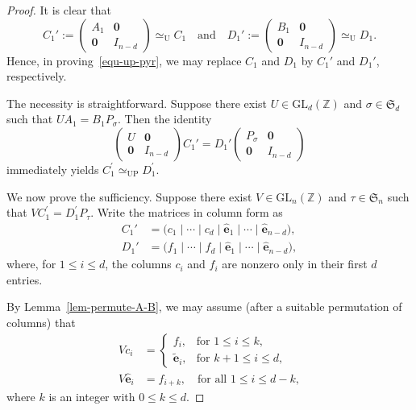 \documentclass[reqno, 12pt]{article}
\theoremstyle{mydefinition}
\theoremstyle{myremark}
\numberwithin{algorithm}{section}
\begin{document}
\begin{proof}
It is clear that
\[
C_1' := \begin{pmatrix}
A_1 & \mathbf{0} \\
\mathbf{0} & I_{n-d}
\end{pmatrix} \simeq_{\mathrm{U}} C_1
\quad \text{and} \quad
D_1' := \begin{pmatrix}
B_1 & \mathbf{0} \\
\mathbf{0} & I_{n-d}
\end{pmatrix} \simeq_{\mathrm{U}} D_1.
\]
Hence, in proving~\eqref{equ-up-pyr}, we may replace $C_1$ and $D_1$ by $C_1'$ and $D_1'$, respectively.

The necessity is straightforward. Suppose there exist $U \in \mathrm{GL}_{d}(\mathbb{Z})$ and $\sigma \in \mathfrak{S}_d$ such that $UA_1 = B_1P_\sigma$. Then the identity
\[
\begin{pmatrix}
U & \mathbf{0} \\
\mathbf{0} & I_{n-d}
\end{pmatrix}
C_1' =
D_1'
\begin{pmatrix}
P_\sigma & \mathbf{0} \\
\mathbf{0} & I_{n-d}
\end{pmatrix}
\]
immediately yields $C_1^{\prime} \simeq_{\mathrm{UP}} D_1^{\prime}$.

We now prove the sufficiency. Suppose there exist $V \in \mathrm{GL}_{n}(\mathbb{Z})$ and $\tau \in \mathfrak{S}_n$ such that $VC_1^{\prime} = D_1^{\prime}P_\tau$. Write the matrices in column form as
\begin{align*}
C_1' &= \big( c_1 \mid \cdots \mid c_{d} \mid \widehat{\mathbf{e}}_1 \mid \cdots \mid \widehat{\mathbf{e}}_{n-d} \big), \\
D_1' &= \big( f_1 \mid \cdots \mid f_{d} \mid \widehat{\mathbf{e}}_1 \mid \cdots \mid \widehat{\mathbf{e}}_{n-d} \big),
\end{align*}
where, for $1 \le i \le d$, the columns $c_i$ and $f_i$ are nonzero only in their first $d$ entries.

By Lemma~\ref{lem-permute-A-B}, we may assume (after a suitable permutation of columns) that
\begin{align}
V c_i &=
\begin{cases}
f_i, & \text{for } 1 \le i \le k, \\
\widetilde{\mathbf{e}}_{i}, & \text{for } k+1 \le i \le d,
\end{cases}
\label{eq:combined1} \\
V \widehat{\mathbf{e}}_i &= f_{i+k}, \quad \text{for all } 1 \le i \le d-k, \label{eq:combined2}
\end{align}
where $k$ is an integer with $0 \le k \le d$.



\end{proof}
\end{document}
